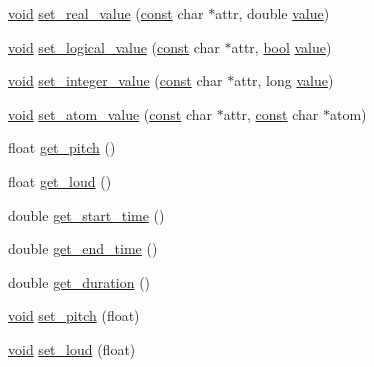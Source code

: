 \begin{DoxyCompactItemize}
\item 
\hyperlink{sound_8c_ae35f5844602719cf66324f4de2a658b3}{void} \hyperlink{class_alg__event_a6142de6a1d705195dc97bd21224b02d6}{set\+\_\+real\+\_\+value} (\hyperlink{getopt1_8c_a2c212835823e3c54a8ab6d95c652660e}{const} char $\ast$attr, double \hyperlink{lib_2expat_8h_a4a30a13b813682e68c5b689b45c65971}{value})
\item 
\hyperlink{sound_8c_ae35f5844602719cf66324f4de2a658b3}{void} \hyperlink{class_alg__event_a52a4178fce0fb83e20a1dab43beec3a1}{set\+\_\+logical\+\_\+value} (\hyperlink{getopt1_8c_a2c212835823e3c54a8ab6d95c652660e}{const} char $\ast$attr, \hyperlink{mac_2config_2i386_2lib-src_2libsoxr_2soxr-config_8h_abb452686968e48b67397da5f97445f5b}{bool} \hyperlink{lib_2expat_8h_a4a30a13b813682e68c5b689b45c65971}{value})
\item 
\hyperlink{sound_8c_ae35f5844602719cf66324f4de2a658b3}{void} \hyperlink{class_alg__event_a7cec469acfc6fcc55dbc86c6eefd30dc}{set\+\_\+integer\+\_\+value} (\hyperlink{getopt1_8c_a2c212835823e3c54a8ab6d95c652660e}{const} char $\ast$attr, long \hyperlink{lib_2expat_8h_a4a30a13b813682e68c5b689b45c65971}{value})
\item 
\hyperlink{sound_8c_ae35f5844602719cf66324f4de2a658b3}{void} \hyperlink{class_alg__event_a55d9dbc04c0bc09c0b729abedbb5ffed}{set\+\_\+atom\+\_\+value} (\hyperlink{getopt1_8c_a2c212835823e3c54a8ab6d95c652660e}{const} char $\ast$attr, \hyperlink{getopt1_8c_a2c212835823e3c54a8ab6d95c652660e}{const} char $\ast$atom)
\item 
float \hyperlink{class_alg__event_a802901f76746d6a26c2eb4d8cf9bc71d}{get\+\_\+pitch} ()
\item 
float \hyperlink{class_alg__event_a43a73d486a1b6d1b118c15cdc12fc7f2}{get\+\_\+loud} ()
\item 
double \hyperlink{class_alg__event_a4798ec8611d7a0ff9437d5ca41ba4281}{get\+\_\+start\+\_\+time} ()
\item 
double \hyperlink{class_alg__event_ae6bb0afe871b11799d553d16730a3123}{get\+\_\+end\+\_\+time} ()
\item 
double \hyperlink{class_alg__event_a09f0c3e24cf5e17f49a1dcbc32e05de5}{get\+\_\+duration} ()
\item 
\hyperlink{sound_8c_ae35f5844602719cf66324f4de2a658b3}{void} \hyperlink{class_alg__event_a33797d88039eb0bdb399ed0c266035b5}{set\+\_\+pitch} (float)
\item 
\hyperlink{sound_8c_ae35f5844602719cf66324f4de2a658b3}{void} \hyperlink{class_alg__event_af0ec3bd8052ddaecb402c73a45b099c6}{set\+\_\+loud} (float)

\end{DoxyCompactItemize}
